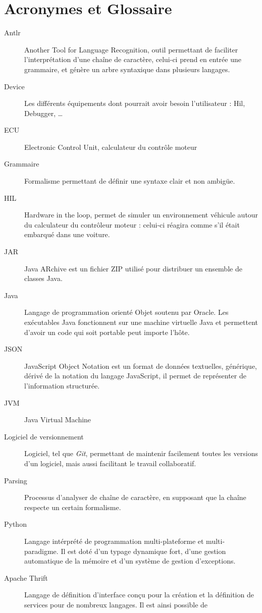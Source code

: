 \chapter{Acronymes et Glossaire}
\begin{description}
\item[Antlr] Another Tool for Language Recognition, outil permettant de faciliter l'interprétation d'une chaîne de caractère, celui-ci prend en entrée une
	grammaire, et génère un arbre syntaxique dans plusieurs langages.
\item[Device] Les différents équipements dont pourrait avoir besoin l'utilisateur : Hil, Debugger, \ldots 
\item[ECU] Electronic Control Unit, calculateur du contrôle moteur
\item[Grammaire] Formalisme permettant de définir une syntaxe clair et non ambigüe.
\item[HIL] Hardware in the loop, permet de simuler un environnement véhicule autour du calculateur du contrôleur moteur : celui-ci réagira comme s'il était embarqué dans une voiture.
\item[JAR] Java ARchive est un fichier ZIP utilisé pour distribuer un ensemble de classes Java.
\item[Java] Langage de programmation orienté Objet soutenu par Oracle. Les exécutables Java fonctionnent sur une machine virtuelle Java et permettent d'avoir un
	code qui soit portable peut importe l'hôte.
\item[JSON] JavaScript Object Notation est un format de données textuelles, générique, dérivé de la notation du langage JavaScript, il permet de représenter de
	l'information structurée.
\item[JVM] Java Virtual Machine
\item[Logiciel de versionnement] Logiciel, tel que \textit{Git}, permettant de maintenir facilement toutes les versions d'un logiciel, mais aussi facilitant le
	travail collaboratif.
\item[Parsing] Processus d'analyser de chaîne de caractère, en supposant que la chaîne respecte un certain formalisme. 
\item[Python] Langage intérprété de programmation multi-plateforme et multi-paradigme. Il est doté d'un typage dynamique fort, d'une gestion automatique de la mémoire et d'un système de gestion d'exceptions. 
\item[Apache Thrift] Langage de définition d'interface conçu pour la création et la définition de services pour de nombreux langages. Il est ainsi possible de

\end{description}
